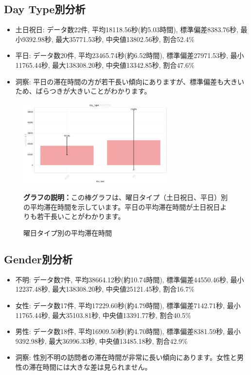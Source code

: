 \documentclass[11pt,a4paper]{article}
\begin{document}
\subsection{Day Type別分析}

\begin{itemize}
    \item 土日祝日: データ数22件, 平均18118.56秒(約5.03時間), 標準偏差8383.76秒, 最小9392.98秒, 最大35771.53秒, 中央値13802.56秒, 割合52.4\%
    \item 平日: データ数20件, 平均23465.74秒(約6.52時間), 標準偏差27971.53秒, 最小11765.44秒, 最大138308.20秒, 中央値13342.85秒, 割合47.6\%
    \item 洞察: 平日の滞在時間の方が若干長い傾向にありますが、標準偏差も大きいため、ばらつきが大きいことがわかります。
\end{itemize}

\begin{figure}[H]
    \centering
    \includegraphics[width=0.7\textwidth]{images/day_type_bar_chart.png}
    \caption{曜日タイプ別の平均滞在時間}
    \label{fig:day_type}
    \textbf{グラフの説明：}この棒グラフは、曜日タイプ（土日祝日、平日）別の平均滞在時間を示しています。平日の平均滞在時間が土日祝日よりも若干長いことがわかります。
\end{figure}

\subsection{Gender別分析}

\begin{itemize}
    \item 不明: データ数7件, 平均38664.12秒(約10.74時間), 標準偏差44550.46秒, 最小12237.48秒, 最大138308.20秒, 中央値25121.45秒, 割合16.7\%
    \item 女性: データ数17件, 平均17229.60秒(約4.79時間), 標準偏差7142.71秒, 最小11765.44秒, 最大35103.81秒, 中央値13391.77秒, 割合40.5\%
    \item 男性: データ数18件, 平均16909.50秒(約4.70時間), 標準偏差8381.59秒, 最小9392.98秒, 最大36996.33秒, 中央値13485.18秒, 割合42.9\%
    \item 洞察: 性別不明の訪問者の滞在時間が非常に長い傾向にあります。女性と男性の滞在時間には大きな差は見られません。
\end{itemize}
\end{document}
